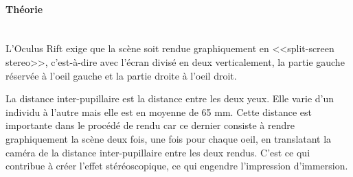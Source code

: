 \documentclass[a4paper,french,12pt]{article}
\begin{document}
			\paragraph{Théorie} ~\\
			
			    L'Oculus Rift exige que la scène soit rendue graphiquement en <<split-screen stereo>>, 
			    c'est-à-dire avec l'écran divisé en deux verticalement, la partie gauche réservée à l'oeil gauche
			    et la partie droite à l'oeil droit.
			    
			    La distance inter-pupillaire est la distance entre les deux yeux. Elle varie d'un individu
			    à l'autre mais elle est en moyenne de 65 mm. Cette distance est importante dans le procédé 
			    de rendu car ce dernier consiste à rendre graphiquement la scène deux fois, une fois pour
			    chaque oeil, en translatant la caméra de la distance inter-pupillaire entre les deux rendus.
			    C'est ce qui contribue à créer l'effet stéréoscopique, ce qui engendre l'impression d'immersion.
			
\end{document}
